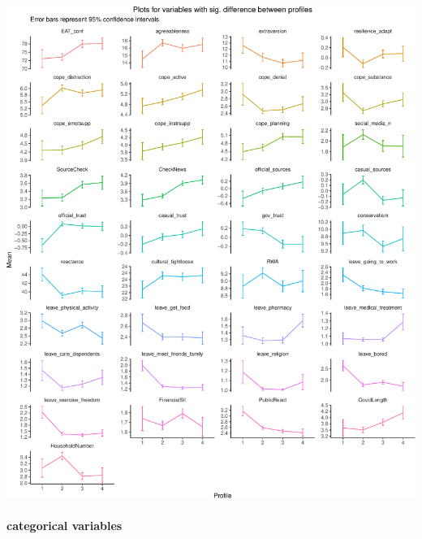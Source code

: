 \documentclass[]{article}
\let\oldparagraph\paragraph
\renewcommand{\paragraph}[1]{\oldparagraph{#1}\mbox{}}
\begin{document}
\begin{center}\includegraphics{lpa_analyses_files/figure-latex/unnamed-chunk-26-1} \end{center}

\newpage

\hypertarget{categorical-variables-2}{%
\paragraph{categorical variables}\label{categorical-variables-2}}
\end{document}
